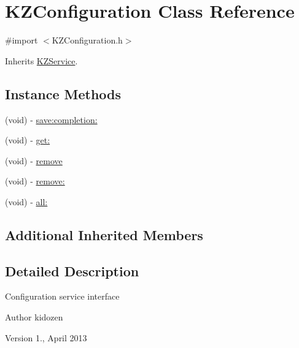 \hypertarget{interface_k_z_configuration}{\section{K\-Z\-Configuration Class Reference}
\label{interface_k_z_configuration}
}


{\ttfamily \#import $<$K\-Z\-Configuration.\-h$>$}



Inherits \hyperlink{interface_k_z_service}{K\-Z\-Service}.

\subsection*{Instance Methods}
\begin{DoxyCompactItemize}
\item 
(void) -\/ \hyperlink{interface_k_z_configuration_a4e4fdfac7efd5970948ff6e204aa755e}{save\-:completion\-:}
\item 
(void) -\/ \hyperlink{interface_k_z_configuration_a10e04df39b1f90c1272a560f5f4b74c4}{get\-:}
\item 
(void) -\/ \hyperlink{interface_k_z_configuration_acc1af01645323a836539f93c5dfb693f}{remove}
\item 
(void) -\/ \hyperlink{interface_k_z_configuration_a85b0596d7550fb01156cdb32b5f6553c}{remove\-:}
\item 
(void) -\/ \hyperlink{interface_k_z_configuration_a2a496702a7579b245f36b22b901d6e36}{all\-:}
\end{DoxyCompactItemize}
\subsection*{Additional Inherited Members}


\subsection{Detailed Description}
Configuration service interface

\begin{DoxyAuthor}{Author}
kidozen 
\end{DoxyAuthor}
\begin{DoxyVersion}{Version}
1., April 2013 
\end{DoxyVersion}


